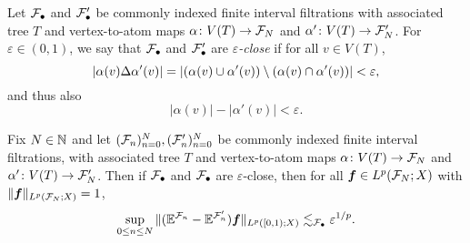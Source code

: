 \begin{figure}
\begin{center}
      \end{center}
\end{figure}

\begin{defn}
  Let $\mathcal{F}_{\bullet}$ and $\mathcal{F}_{\bullet}'$ be commonly indexed finite interval filtrations with associated tree $T$ and vertex-to-atom maps $\alpha \colon V(T) \rightarrow \mathcal{F}_{N}$ and $\alpha' \colon V(T) \rightarrow \mathcal{F}_{N}'$.
  For $\varepsilon \in (0,1)$, we say that $\mathcal{F}_{\bullet}$ and $\mathcal{F}_{\bullet}'$ are \emph{$\varepsilon$-close} if for all $v \in V(T)$,
  \begin{equation*}
    |\alpha(v) \Delta \alpha'(v)| = |(\alpha(v) \cup \alpha'(v)) \setminus (\alpha(v) \cap \alpha'(v))| < \varepsilon,
  \end{equation*}
  and thus also
  \begin{equation*}
    |\alpha(v)| - |\alpha'(v)| < \varepsilon.
  \end{equation*}
\end{defn}

\begin{lem}\label{lem:closeness}
  Fix $N \in \mathbb{N}$ and let $(\mathcal{F}_{n})_{n=0}^{N}, (\mathcal{F}'_{n})_{n=0}^{N}$ be commonly indexed finite interval filtrations, with associated tree $T$ and vertex-to-atom maps $\alpha \colon V(T) \rightarrow \mathcal{F}_{N}$ and $\alpha' \colon V(T) \rightarrow \mathcal{F}_{N}'$.
  Then if $\mathcal{F}_{\bullet}$ and $\mathcal{F}_{\bullet}$ are $\varepsilon$-close, then for all $\bm{f} \in L^p(\mathcal{F}_{N};X)$ with $\|\bm{f}\|_{L^p(\mathcal{F}_{N};X)} = 1$,
  \begin{equation*}
    \sup_{0 \leq n \leq N} \|(\mathbb{E}^{\mathcal{F}_{n}} - \mathbb{E}^{\mathcal{F}_{n}'})\bm{f}\|_{L^p([0,1);X)} \lesssim_{\mathcal{F}_{\bullet}} \varepsilon^{1/p}.
  \end{equation*}
\end{lem}


